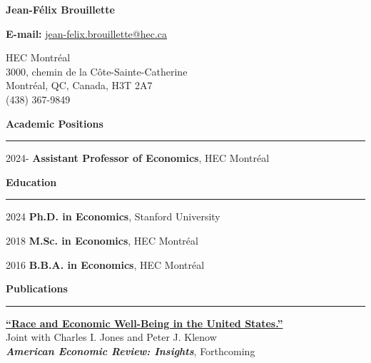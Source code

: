 \documentclass[12pt]{article}
\begin{document}
\begin{center}
{\huge \textbf{Jean-F\'elix Brouillette}} \\

\vspace{0.5cm}

\textbf{E-mail:} \href{mailto:jean-felix.brouillette@hec.ca}{jean-felix.brouillette@hec.ca} \\

\vspace{0.5cm}

\begin{small}
HEC Montr\'eal \\
3000, chemin de la C\^ote-Sainte-Catherine \\
Montr\'eal, QC, Canada, H3T 2A7 \\
(438) 367-9849
\end{small}
\end{center}

{\large \textbf{Academic Positions}} \\
\noindent\rule[0.5\baselineskip]{\textwidth}{1pt}

\begin{small}
2024- \tabto{1.5cm} \textbf{Assistant Professor of Economics}, HEC Montr\'eal
\end{small}

\vspace{0.5cm}

{\large \textbf{Education}} \\
\noindent\rule[0.5\baselineskip]{\textwidth}{1pt}

\begin{small}
2024 \tabto{1.5cm} \textbf{Ph.D. in Economics}, Stanford University

2018 \tabto{1.5cm} \textbf{M.Sc. in Economics}, HEC Montr\'eal

2016 \tabto{1.5cm} \textbf{B.B.A. in Economics}, HEC Montr\'eal
\end{small}

\vspace{0.5cm}

{\large \textbf{Publications}} \\
\noindent\rule[0.5\baselineskip]{\textwidth}{1pt}

\begin{small}
\href{http://klenow.com/BrouilletteJonesKlenow_Race_and_Welfare.pdf}{\textbf{``Race and Economic Well-Being in the United States.''}} \\
Joint with Charles I. Jones and Peter J. Klenow \\
\textit{\textbf{American Economic Review: Insights}}, Forthcoming
\end{small}
\end{document}
